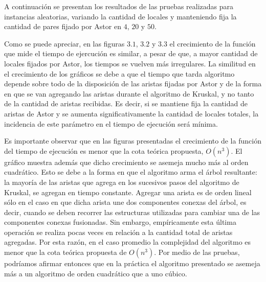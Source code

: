 \documentclass[a4paper,11pt] {article}
\begin{document}
A continuaci\'on se presentan los resultados de las pruebas realizadas para instancias aleatorias, variando la cantidad de locales y manteniendo fija la cantidad de pares fijado por Astor en $4$, $20$ y $50$.

% 
% 

Como se puede apreciar, en las figuras $3.1$, $3.2$ y $3.3$ el crecimiento de la funci\'on que mide el tiempo de ejercuci\'on es similar, a pesar de que, a mayor cantidad de locales fijados por Astor, los tiempos se vuelven m\'as irregulares. La similitud en el crecimiento de los gr\'aficos se debe a que el tiempo que tarda algoritmo depende sobre todo de la disposici\'on de las aristas fijadas por Astor y de la forma en que se van agregando las aristas durante el algoritmo de Kruskal, y no tanto de la cantidad de aristas recibidas. Es decir, si se mantiene fija la cantidad de aristas de Astor y se aumenta significativamente la cantidad de locales totales, la incidencia de este par\'ametro en el tiempo de ejecuci\'on ser\'a m\'inima.

Es importante observar que en las figuras presentadas el crecimiento de la funci\'on del tiempo de ejecuci\'on es menor que la cota te\'orica propuesta, $O(n^{3})$. El gr\'afico muestra adem\'as que dicho crecimiento se asemeja mucho m\'as al orden cuadr\'atico. Esto se debe a la forma en que el algoritmo arma el \'arbol resultante: la mayor\'ia de las aristas que agrega en los sucesivos pasos del algoritmo de Kruskal, se agregan en tiempo constante. Agregar una arista es de orden lineal s\'olo en el caso en que dicha arista une dos componentes conexas del \'arbol, es decir, cuando se deben recorrer las estructuras utilizadas para cambiar una de las componentes conexas fusionadas. Sin embargo, emp\'iricamente esta \'ultima operaci\'on  se realiza pocas veces en relaci\'on a la cantidad total de aristas agregadas. Por esta raz\'on, en el caso promedio la complejidad del algoritmo es menor que la cota te\'orica propuesta de $O(n^{3})$. Por medio de las pruebas, podr\'iamos afirmar entonces que en la pr\'actica el algoritmo presentado se asemeja m\'as a un algoritmo de orden cuadr\'atico que a uno c\'ubico.
\end{document}
